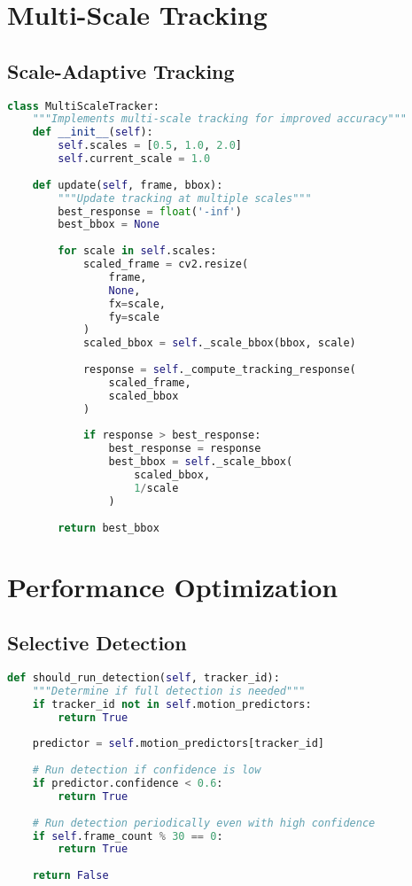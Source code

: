 \section{Multi-Scale Tracking}

\subsection{Scale-Adaptive Tracking}
\begin{lstlisting}[language=Python]
class MultiScaleTracker:
    """Implements multi-scale tracking for improved accuracy"""
    def __init__(self):
        self.scales = [0.5, 1.0, 2.0]
        self.current_scale = 1.0
        
    def update(self, frame, bbox):
        """Update tracking at multiple scales"""
        best_response = float('-inf')
        best_bbox = None
        
        for scale in self.scales:
            scaled_frame = cv2.resize(
                frame, 
                None, 
                fx=scale, 
                fy=scale
            )
            scaled_bbox = self._scale_bbox(bbox, scale)
            
            response = self._compute_tracking_response(
                scaled_frame,
                scaled_bbox
            )
            
            if response > best_response:
                best_response = response
                best_bbox = self._scale_bbox(
                    scaled_bbox,
                    1/scale
                )
                
        return best_bbox
\end{lstlisting}

\section{Performance Optimization}

\subsection{Selective Detection}
\begin{lstlisting}[language=Python]
def should_run_detection(self, tracker_id):
    """Determine if full detection is needed"""
    if tracker_id not in self.motion_predictors:
        return True
        
    predictor = self.motion_predictors[tracker_id]
    
    # Run detection if confidence is low
    if predictor.confidence < 0.6:
        return True
        
    # Run detection periodically even with high confidence
    if self.frame_count % 30 == 0:
        return True
        
    return False
\end{lstlisting}

